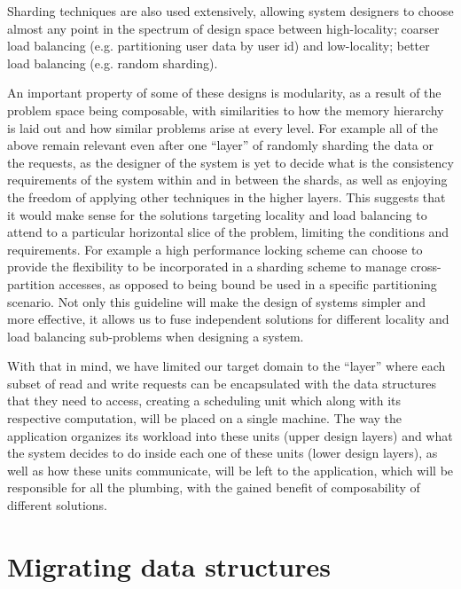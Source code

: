 Sharding techniques are also used extensively, allowing system designers to
choose almost any point in the spectrum of design space between high-locality;
coarser load balancing (e.g. partitioning user data by user id) and
low-locality; better load balancing (e.g. random sharding).

An important property of some of these designs is modularity, as
a result of the problem space being composable, with similarities to how the
memory
hierarchy is laid out and how similar problems arise at every level. For
example all of the above remain
relevant even after one ``layer'' of randomly sharding the data or the requests,
as the designer of the system is yet to decide what is the consistency
requirements of the system within and in between the shards, as well as
enjoying the freedom of applying other techniques in the higher layers.
This suggests that
it would make sense for the solutions targeting locality and
load balancing to attend to a particular horizontal slice of the problem,
limiting the conditions and requirements. For example a high performance
locking scheme can choose to provide the flexibility to be incorporated in a
sharding scheme to manage cross-partition accesses, as opposed to being bound
be used in a specific partitioning scenario.
Not only this guideline
will make the design of systems simpler and more effective, it allows us to
fuse independent solutions for different locality and load balancing
sub-problems when designing a system.

With that in mind, we have limited our target domain to the ``layer'' where each
subset of read and write requests can be encapsulated with the data structures
that they need to access, creating a scheduling unit which along with its
respective computation, will be placed on a single machine. The way the
application organizes its workload into these units (upper design layers)
and what the system decides to do inside each one of these units (lower design
layers), as well as how these units communicate, will be left to the
application, which will be responsible for all the plumbing, with the gained
benefit of composability of different solutions.



\newpage



\section{Migrating data structures}







